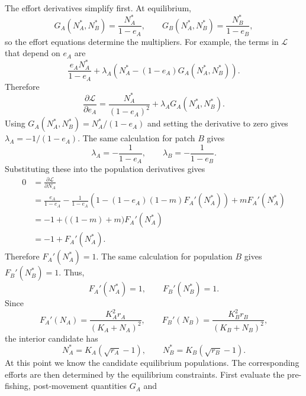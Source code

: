 \documentclass{article}
\numberwithin{equation}{section}
\begin{document}
The effort derivatives simplify first. At equilibrium,
\begin{equation*}
    G_A(N_A^*,N_B^*)=\frac{N_A^*}{1-e_A},
    \qquad
    G_B(N_A^*,N_B^*)=\frac{N_B^*}{1-e_B},
\end{equation*}
so the effort equations determine the multipliers. For example, the
terms in $\mathcal{L}$ that depend on $e_A$ are
\begin{equation*}
    \frac{e_A N_A^*}{1-e_A}
    +
    \lambda_A
    \left(N_A^*-(1-e_A)G_A(N_A^*,N_B^*)\right).
\end{equation*}
Therefore
\begin{equation*}
    \frac{\partial\mathcal{L}}{\partial e_A}
    =
    \frac{N_A^*}{(1-e_A)^2}
    +
    \lambda_A G_A(N_A^*,N_B^*).
\end{equation*}
Using $G_A(N_A^*,N_B^*)=N_A^*/(1-e_A)$ and setting the derivative to
zero gives $\lambda_A=-1/(1-e_A)$. The same calculation for patch $B$
gives
\begin{equation*}
    \lambda_A=-\frac{1}{1-e_A},
    \qquad
    \lambda_B=-\frac{1}{1-e_B}.
\end{equation*}
Substituting these into the population derivatives gives
\begin{align*}
    0
        &=
        \frac{\partial\mathcal{L}}{\partial N_A}\\
        &=
        \frac{e_A}{1-e_A}
        -\frac{1}{1-e_A}
        \left(1-(1-e_A)(1-m)F_A'(N_A^*)\right)
        +mF_A'(N_A^*)\\
        &=
        -1+\bigl((1-m)+m\bigr)F_A'(N_A^*)\\
        &=
        -1+F_A'(N_A^*).
\end{align*}
Therefore $F_A'(N_A^*)=1$. The same calculation for population $B$
gives $F_B'(N_B^*)=1$. Thus,
\begin{equation*}
    F_A'(N_A^*)=1,
    \qquad
    F_B'(N_B^*)=1.
\end{equation*}
Since
\begin{equation*}
    F_A'(N_A)=\frac{K_A^2r_A}{(K_A+N_A)^2},
    \qquad
    F_B'(N_B)=\frac{K_B^2r_B}{(K_B+N_B)^2},
\end{equation*}
the interior candidate has
\begin{equation*}
    N_A^*=K_A(\sqrt{r_A}-1),
    \qquad
    N_B^*=K_B(\sqrt{r_B}-1).
\end{equation*}
At this point we know the candidate equilibrium populations. The
corresponding efforts are then determined by the equilibrium constraints.
First evaluate the pre-fishing, post-movement quantities $G_A$ and
\end{document}
